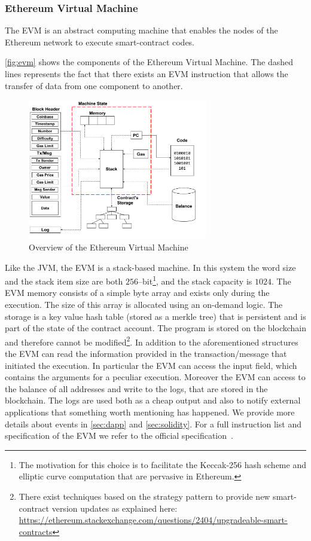\subsubsection{Ethereum Virtual Machine}
\label{sec:evm}
The EVM is an abstract computing machine that enables the nodes of the Ethereum
network to execute smart-contract codes.

\autoref{fig:evm} shows the components of the Ethereum Virtual Machine.
The dashed lines represents the fact that there exists an EVM instruction
that allows the transfer of data from one component to another.
\begin{figure}
	\begin{center}
		\includegraphics[width=0.7\textwidth]
        {./res/img/evm-overview.pdf}
	\end{center}
	\caption{Overview of the Ethereum Virtual Machine}
	\label{fig:evm}
\end{figure}
Like the JVM, the EVM is a stack-based machine. In this system the word size
and the stack item size are both $256$--bit\footnote{The motivation
for this choice is to facilitate the Keccak-256 hash scheme and elliptic
curve computation that are pervasive in Ethereum.},
and the stack capacity is $1024$.
The EVM memory consists of a simple byte array and exists only during the
execution. The size of this array is allocated using an on-demand logic.
The storage is a key value hash table (stored as a merkle tree) that is
persistent and is part of the state of the contract account.
The program is stored on the blockchain and therefore cannot
be modified\footnote{There exist
techniques based on the strategy pattern to provide new smart-contract version
updates as explained here:
\url{https://ethereum.stackexchange.com/questions/2404/upgradeable-smart-contracts}}.
In addition to the aforementioned structures the EVM can read the information
provided in the transaction/message that initiated the execution. In particular
the EVM can access the input field, which contains the arguments for a peculiar
execution.
Moreover the EVM can access to the balance of all addresses and write to the
logs, that are stored in the blockchain. The logs are used both as a cheap
output and also to notify external applications that something worth mentioning
has happened. We provide more details about events in \autoref{sec:dapp}
and \autoref{sec:solidity}.
For a full instruction list and specification of the EVM we refer to the
official specification~\cite[Appendix H]{wood2018ethereum}.


